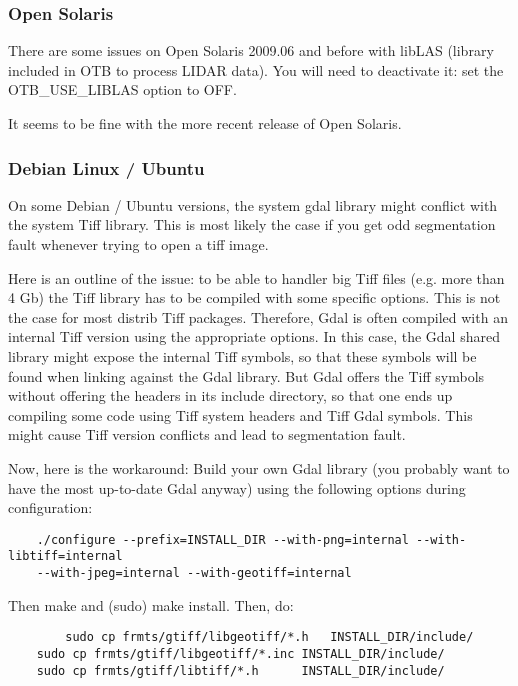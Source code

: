 \subsubsection{Open Solaris}
There are some issues on Open Solaris 2009.06 and before with libLAS (library included
in OTB to process LIDAR data). You will need to deactivate it: set the
OTB\_USE\_LIBLAS option to OFF.

It seems to be fine with the more recent release of Open Solaris.

\subsubsection{Debian Linux / Ubuntu}

On some Debian / Ubuntu versions, the system gdal library might conflict with the system Tiff library. This is most likely the case if you get odd segmentation fault whenever trying to open a tiff image.

Here is an outline of the issue: to be able to handler big Tiff files (e.g. more than 4 Gb) the Tiff library has to be compiled with some specific options. This is not the case for most distrib Tiff packages. Therefore, Gdal is often compiled with an internal Tiff version using the appropriate options. In this case, the Gdal shared library might expose the internal Tiff symbols, so that these symbols will be found when linking against the Gdal library. But Gdal offers the Tiff symbols without offering the headers in its include directory, so that one ends up compiling some code using Tiff system headers and Tiff Gdal symbols. This might cause Tiff version conflicts and lead to segmentation fault.

Now, here is the workaround: Build your own Gdal library (you probably want to have the most up-to-date Gdal anyway) using the following options during configuration:
\begin{verbatim}
	./configure --prefix=INSTALL_DIR --with-png=internal --with-libtiff=internal
	--with-jpeg=internal --with-geotiff=internal
\end{verbatim}

Then make and (sudo) make install. Then, do:

\begin{verbatim}
        sudo cp frmts/gtiff/libgeotiff/*.h   INSTALL_DIR/include/
	sudo cp frmts/gtiff/libgeotiff/*.inc INSTALL_DIR/include/
	sudo cp frmts/gtiff/libtiff/*.h      INSTALL_DIR/include/ 
\end{verbatim}

